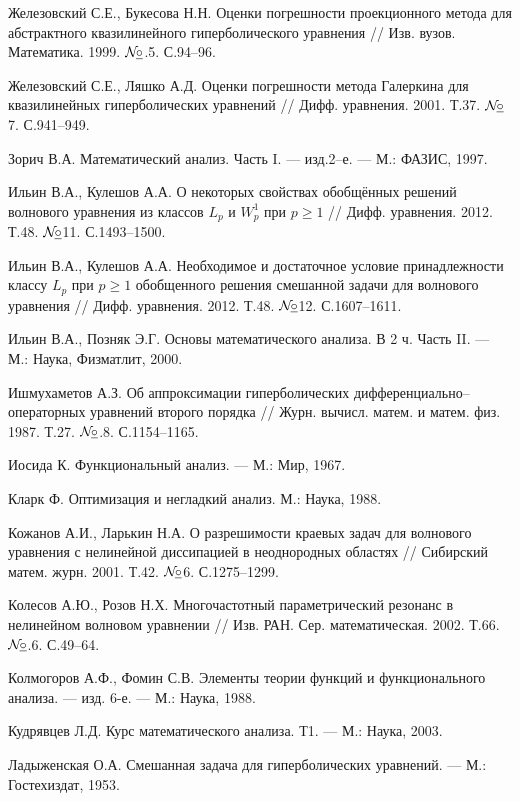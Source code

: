 \documentclass{report}
\newcommand{\No}{${\cal N}{\!}\underline{\circ}$}
\begin{document}
\begin{thebibliography}{99}
 Железовский С.Е., Букесова Н.Н. Оценки погрешности проекционного метода для абстрактного квазилинейного гиперболического уравнения // Изв. вузов. Математика.
1999. \No.5. С.94--96.

 Железовский С.Е., Ляшко А.Д. Оценки погрешности метода Галеркина для квазилинейных гиперболических уравнений // Дифф. уравнения. 2001. Т.37. \No7. С.941--949.

Зорич В.А. Математический анализ. Часть I. --- изд.2--е. --- М.: ФАЗИС, 1997.

Ильин В.А., Кулешов А.А. О некоторых свойствах обобщённых решений волнового уравнения из классов $L_p$ и $W^1_p$ при $p\geq1$
// Дифф. уравнения. 2012. Т.48. \No11. С.1493--1500.

Ильин В.А., Кулешов А.А. Необходимое и достаточное условие принадлежности классу $L_p$ при $p\geq1$ обобщенного решения смешанной задачи для волнового уравнения
// Дифф. уравнения. 2012. Т.48. \No12. С.1607--1611.

 Ильин В.А., Позняк Э.Г.  Основы математического анализа. В 2 ч. Часть II. --- М.: Наука, Физматлит, 2000.

 Ишмухаметов А.З. Об аппроксимации гиперболических дифференциально--операторных уравнений второго порядка // Журн. вычисл. матем. и матем. физ. 1987. Т.27. \No.8.
С.1154--1165.

 Иосида К. Функциональный анализ. --- М.: Мир, 1967.

 Кларк Ф. { Оптимизация и негладкий анализ.} М.: Наука, 1988.

 Кожанов А.И., Ларькин Н.А. О разрешимости краевых задач для волнового уравнения с нелинейной диссипацией в неоднородных областях // Сибирский матем. журн.
2001. Т.42. \No6. С.1275--1299.

 Колесов А.Ю., Розов Н.Х. Многочастотный параметрический резонанс в нелинейном волновом уравнении // Изв. РАН. Сер. математическая. 2002. Т.66. \No.6. С.49--64.

 Колмогоров А.Ф., Фомин С.В. Элементы теории функций и функционального анализа. --- изд. 6-е. --- М.: Наука, 1988.

Кудрявцев Л.Д. Курс математического анализа. Т1. --- М.: Наука, 2003.

 Ладыженская О.А. Смешанная задача для гиперболических уравнений. --- М.: Гостехиздат, 1953.


\end{thebibliography}
\end{document}
